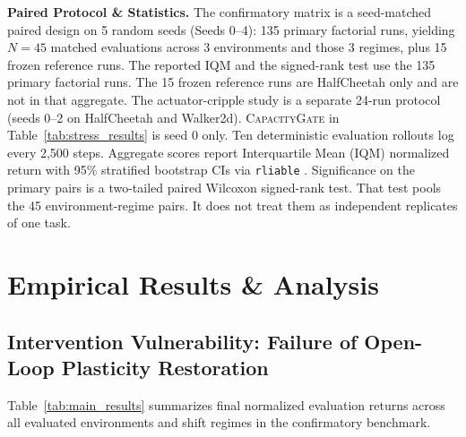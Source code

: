 \documentclass{article}
\begin{document}
\textbf{Paired Protocol \& Statistics.} The confirmatory matrix is a seed-matched paired design on 5 random seeds (Seeds 0--4): 135 primary factorial runs, yielding $N = 45$ matched evaluations across 3 environments and those 3 regimes, plus 15 frozen reference runs. The reported IQM and the signed-rank test use the 135 primary factorial runs. The 15 frozen reference runs are HalfCheetah only and are not in that aggregate. The actuator-cripple study is a separate 24-run protocol (seeds 0--2 on HalfCheetah and Walker2d). \textsc{CapacityGate} in Table~\ref{tab:stress_results} is seed 0 only. Ten deterministic evaluation rollouts log every 2,500 steps. Aggregate scores report Interquartile Mean (IQM) normalized return with 95\% stratified bootstrap CIs via \texttt{rliable} \citep{agarwal2021deep}. Significance on the primary pairs is a two-tailed paired Wilcoxon signed-rank test. That test pools the 45 environment-regime pairs. It does not treat them as independent replicates of one task.

\section{Empirical Results \& Analysis}
\label{sec:results}

\subsection{Intervention Vulnerability: Failure of Open-Loop Plasticity Restoration}
\label{sec:vulnerability}

Table~\ref{tab:main_results} summarizes final normalized evaluation returns across all evaluated environments and shift regimes in the confirmatory benchmark.
\end{document}

